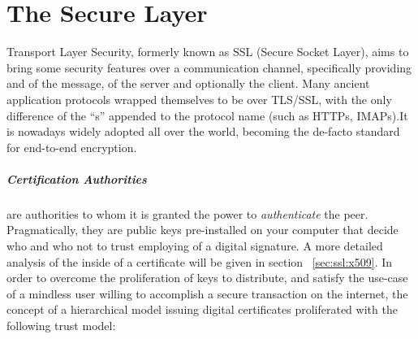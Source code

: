 \chapter{The Secure Layer \label{chap:ssl}}

Transport Layer Security, formerly known as SSL (Secure Socket Layer), aims
to bring some security features over a communication channel, specifically
providing  and  of the message,  of the server and
optionally the client.
Many ancient application protocols wrapped themselves to be over TLS/SSL, with
the only difference of the ``s'' appended to the protocol name (such as HTTPs,
IMAPs).It is nowadays widely adopted all over the world, becoming the de-facto standard for
end-to-end  encryption.

\paragraph{Certification Authorities} are authorities to whom it is granted the
power to \emph{authenticate} the peer. Pragmatically, they are public keys
pre-installed on your computer that decide who and who not to trust employing
of a digital signature. A more detailed analysis of the inside of a certificate
will be given in section ~\ref{sec:ssl:x509}.
In order to overcome the proliferation of keys to distribute, and satisfy the
use-case of a mindless user willing to accomplish a secure transaction on the
internet, the concept of a hierarchical model issuing digital certificates
proliferated with the following trust model:
\\
\\
\begin{center}
\end{center}


